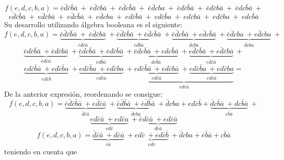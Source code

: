 \documentclass[a4paper]{article}
\begin{document}
\begin{center}
\[
	f \left( e,d,c,b,a \right) = \bar{e}\bar{d}\bar{c}\bar{b}\bar{a} \ + \ \bar{e}\bar{d}\bar{c}b\bar{a} \ + \ \bar{e}\bar{d}c\bar{b}\bar{a} \ + \ \bar{e}\bar{d}cba \ + \ \bar{e}d\bar{c}\bar{b}\bar{a} \ + \ \bar{e}d\bar{c}b\bar{a} \ + \ \bar{e}dc\bar{b}\bar{a} \ +
\]
\[
	e\bar{d}\bar{c}\bar{b}\bar{a} \ + \ e\bar{d}\bar{c}b\bar{a} \ + \ e\bar{d}c\bar{b}\bar{a} \ + \ e\bar{d}cba \ + \ ed\bar{c}\bar{b}\bar{a}\ + \ ed\bar{c}\bar{b}a \ + \ ed\bar{c}b\bar{a} \ + \ ed\bar{c}ba \ + \ edc\bar{b}\bar{a} 
\]
Su desarrollo utilizando álgebra booleana es el siguiente:
\[
	f \left( e,d,c,b,a \right) = \underbrace{\bar{e}\bar{d}\bar{c}\bar{b}\bar{a} \ + \ \bar{e}\bar{d}\bar{c}b\bar{a} }_{\bar{e}\bar{d}\bar{c}\bar{a}}\ + 							\underbrace{\bar{e}\bar{d}\bar{c}\bar{b}\bar{a} \ + \bar{e}\bar{d}c\bar{b}  \bar{a}  }_{\bar{e}\bar{d}\bar{b}\bar{a}}\  +
				\underbrace{\bar{e}\bar{d} c \bar{b}\bar{a} \ + e \bar{d} c\bar{b}  \bar{a}  }_{\bar{d}c\bar{b}\bar{a}}\  +
				\underbrace{\bar{e}\bar{d} c b a \ + e \bar{d} c b a  }_{ \bar{d} c b a}\ +
\]
\[
				\underbrace{\bar{e} d  \bar{c} \bar{b} \bar{a} \ + \bar{e} d \bar{c} b \bar{a}  }_{ \bar{e} d \bar{c}  \bar{a}}\ +
				\underbrace{\bar{e} d  c \bar{b} \bar{a} \ + \bar{e} d \bar{c} \bar{b} \bar{a}  }_{ \bar{e} d \bar{b}  \bar{a}}\ +
				\underbrace{\bar{e} d  c \bar{b} \bar{a} \ + e d c \bar{b} \bar{a}  }_{  d c \bar{b}  \bar{a}}\ +
				\underbrace{e \bar{d} \bar{c} \bar{b} \bar{a} \ + e \bar{d} \bar{c} b \bar{a}  }_{  e\bar{d}  \bar{c}  \bar{a}}\ +
\]
\[
				\underbrace{e d \bar{c} \bar{b} \bar{a} \ + e d \bar{c} \bar{b} a }_{  e d  \bar{c}  \bar{b}}\ +
				\underbrace{e  d \bar{c} \bar{b} a \ + e d \bar{c} b a  }_{  ed  \bar{c}  a}\ +
				\underbrace{\underbrace{e d \bar{c} \bar{b} \bar{a} \ + e d \bar{c} b \bar{a}  }_{  ed  \bar{c}  \bar{a}}\ +
				\underbrace{e d \bar{c} \bar{b} a \ + e d \bar{c} b a  }_{ ed \bar{c}  \bar{a}}}_{  ed  \bar{c}  \bar{a}} =
\]
De la anterior expresión, reordenando se consigue:
\[
				f \left( e,d,c,b,a \right) =\underbrace{\bar{e} \bar{d} \bar{c} \bar{b} \bar{a} \ + e \bar{d} \bar{c} \bar{a}  }_{  \bar{d}  \bar{c}  \bar{a}}\ +
						\underbrace{\bar{e} \bar{d} \bar{b} \bar{a}  \ + \bar{e} \bar{d} \bar{b} \bar{a}  }_{  \bar{d}  c b a}\ +
						\bar{d} cba + ed\bar{c}\bar{b}+
						\underbrace{\bar{d} c \bar{b} \bar{a} \ + d c \bar{b} \bar{a}  }_{  c \bar{b} \bar{a}}\ +
\]
\[	
					\underbrace{e d  \bar{c} \bar{a} \ + e d \bar{c} a  }_{  ed \bar{c} }\ +
					\underbrace{\bar{e} d \bar{c} \bar{a} \ + e d \bar{c} \bar{a}  }_{  d \bar{c} \bar{a}}
\]
\[	
				f \left( e,d,c,b,a \right) =\underbrace{\bar{d}   \bar{c} \bar{a} \ + d  \bar{c} \bar{a}   }_{  \bar{c}\bar{a} }\ +
						\underbrace{e  d \bar{c} \ +e d  \bar{c} \bar{b}   }_{  e  d \bar{c}  }\ +\bar{d}cba+\bar{e}\bar{b}\bar{a}+c\bar{b}\bar{a}
\]
teniendo en cuenta que 


\end{center}
\end{document}
